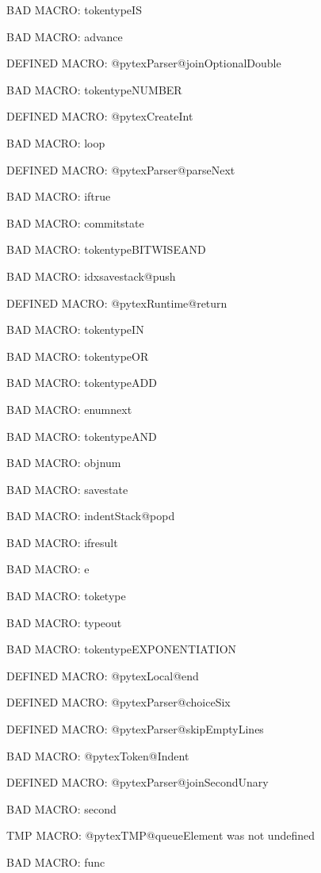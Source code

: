 BAD MACRO: tokentypeIS

BAD MACRO: advance

\ifx\@pytexParser@joinOptionalDouble\undefined\else DEFINED MACRO: @pytexParser@joinOptionalDouble
\fi

BAD MACRO: tokentypeNUMBER

\ifx\@pytexCreateInt\undefined\else DEFINED MACRO: @pytexCreateInt
\fi

BAD MACRO: loop

\ifx\@pytexParser@parseNext\undefined\else DEFINED MACRO: @pytexParser@parseNext
\fi

BAD MACRO: iftrue

BAD MACRO: commitstate

BAD MACRO: tokentypeBITWISEAND

BAD MACRO: idxsavestack@push

\ifx\@pytexRuntime@return\undefined\else DEFINED MACRO: @pytexRuntime@return
\fi

BAD MACRO: tokentypeIN

BAD MACRO: tokentypeOR

BAD MACRO: tokentypeADD

BAD MACRO: enumnext

BAD MACRO: tokentypeAND

BAD MACRO: objnum

BAD MACRO: savestate

BAD MACRO: indentStack@popd

BAD MACRO: ifresult

BAD MACRO: e

BAD MACRO: toketype

BAD MACRO: typeout

BAD MACRO: tokentypeEXPONENTIATION

\ifx\@pytexLocal@end\undefined\else DEFINED MACRO: @pytexLocal@end
\fi

\ifx\@pytexParser@choiceSix\undefined\else DEFINED MACRO: @pytexParser@choiceSix
\fi

\ifx\@pytexParser@skipEmptyLines\undefined\else DEFINED MACRO: @pytexParser@skipEmptyLines
\fi

BAD MACRO: @pytexToken@Indent

\ifx\@pytexParser@joinSecondUnary\undefined\else DEFINED MACRO: @pytexParser@joinSecondUnary
\fi

BAD MACRO: second

\ifx\@pytexTMP@queueElement\undefined\else TMP MACRO: @pytexTMP@queueElement was not undefined
\fi

BAD MACRO: func

